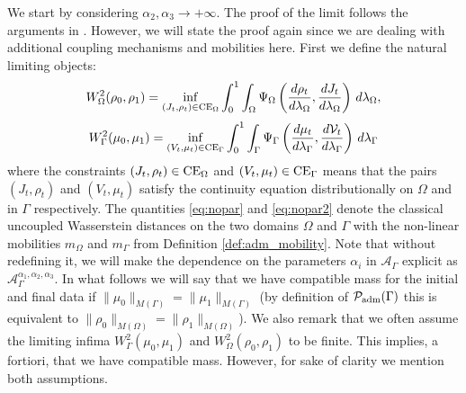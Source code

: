 \documentclass{article}
\begin{document}
We start by considering $\alpha_2, \alpha_3 \to+\infty$. The proof of the limit follows the arguments in \cite{monsaingeon2021new}. However, we will state the proof again since we are dealing with additional coupling mechanisms and mobilities here. First we define the natural limiting objects:
\begin{align}\label{eq:nopar}
W^2_\Omega(\rho_0,\rho_1) =
\inf_{(J_t,\rho_t) \in {\rm CE}_\Omega }\int_0^1\int_{\Omega}\Psi_\Omega\left(\frac{d\rho_t}{d\lambda_\Omega}, \frac{dJ_t}{d\lambda_\Omega} \right) \, d\lambda_\Omega,
\end{align}
\begin{align}\label{eq:nopar2}
W^2_\Gamma(\mu_0,\mu_1) =
\inf_{(V_t,\mu_t) \in {\rm CE}_\Gamma }\int_0^1\int_{\Gamma} \Psi_\Gamma\left(\frac{d\mu_t}{d\lambda_\Gamma},\frac{d\mathcal{V}_t}{d\lambda_\Gamma}\right) \, d\lambda_\Gamma
\end{align}
where the constraints $(J_t,\rho_t) \in {\rm CE}_\Omega$ and $(V_t,\mu_t) \in {\rm CE}_\Gamma$ means that the pairs $(J_t,\rho_t)$ and $(V_t,\mu_t)$ satisfy the continuity equation distributionally on $\Omega$ and in $\Gamma$ respectively. The quantities \eqref{eq:nopar} and \eqref{eq:nopar2} denote the classical uncoupled Wasserstein distances on the two domains $\Omega$ and $\Gamma$ with the non-linear mobilities $m_\Omega$ and $m_\Gamma$ from Definition \ref{def:adm_mobility}.
Note that without redefining it, we will make the dependence on the parameters $\alpha_i$ in $\mathcal{A}_\Gamma$ explicit as $\mathcal{A}_\Gamma^{\alpha_1,\alpha_2,\alpha_3}$.
In what follows we will say that we have compatible mass for the initial and final data if $\|\mu_0\|_{M(\Gamma)} = \| \mu_1\|_{M(\Gamma)}$ (by definition of $\mathcal{P}_{\rm adm}(\Gamma)$ this is equivalent to $\|\rho_0\|_{M(\Omega)} = \|\rho_1\|_{M(\Omega)}$).
We also remark that we often assume the limiting infima $W^2_\Gamma(\mu_0,\mu_1)$ and $W^2_\Omega(\rho_0,\rho_1)$ to be finite. This implies, a fortiori, that we have compatible mass. However, for sake of clarity we mention both assumptions.
\end{document}
